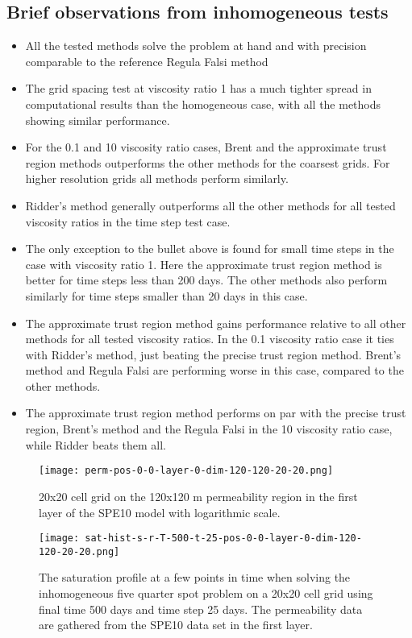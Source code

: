 \documentclass[a4paper,12pt]{report}
\begin{document}
\subsection{Brief observations from inhomogeneous tests}
\begin{itemize}
\item All the tested methods solve the problem at hand and with precision comparable to the reference Regula Falsi method
\item The grid spacing test at viscosity ratio 1 has a much tighter spread in computational results than the homogeneous case, with all the methods showing similar performance.
\item For the 0.1 and 10 viscosity ratio cases, Brent and the approximate trust region methods outperforms the other methods for the coarsest grids. For higher resolution grids all methods perform similarly.
\item Ridder's method generally outperforms all the other methods for all tested viscosity ratios in the time step test case.
\item The only exception to the bullet above is found for small time steps in the case with viscosity ratio 1. Here the approximate trust region method is better for time steps less than 200 days. The other methods also perform similarly for time steps smaller than 20 days in this case.
\item The approximate trust region method gains performance relative to all other methods for all tested viscosity ratios. In the 0.1 viscosity ratio case it ties with Ridder's method, just beating the precise trust region method. Brent's method and Regula Falsi are performing worse in this case, compared to the other methods.
\item The approximate trust region method performs on par with the precise trust region, Brent's method and the Regula Falsi in the 10 viscosity ratio case, while Ridder beats them all.
\end{itemize}

\begin{figure}[!ht]
\begin{center}
\texttt{[image: perm-pos-0-0-layer-0-dim-120-120-20-20.png]}
\end{center}
\caption{20x20 cell grid on the 120x120 m permeability region in the first layer of the SPE10 model with logarithmic scale.}
\label{fig:perm-pos-0-0-layer-0-dim-120-120-20-20}
\end{figure}

\begin{figure}[!ht]
\begin{center}
\texttt{[image: sat-hist-s-r-T-500-t-25-pos-0-0-layer-0-dim-120-120-20-20.png]}
\end{center}
\caption{The saturation profile at a few points in time when solving the inhomogeneous five quarter spot problem on a 20x20 cell grid using final time 500 days and time step 25 days. The permeability data are gathered from the SPE10 data set in the first layer.}
\label{fig:testCase2_solution_profile_comparison_inhomo}
\end{figure}
\end{document}
